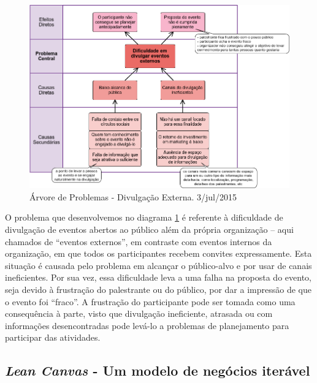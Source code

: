 \documentclass[12pt,a4paper,twoside,hyphens,english,brazil]{abntex2}
\begin{document}
\begin{figure}[!h]
	\centering
	\includegraphics[width=1\linewidth]{diagramas/arvore-problemas-divulgacao.png}
	\caption{Árvore de Problemas - Divulgação Externa. 3/jul/2015}
	\label{diag:arvore}
\end{figure}

O problema que desenvolvemos no diagrama \ref{diag:arvore} é referente à dificuldade de divulgação de eventos abertos ao público além da própria organização -- aqui chamados de ``eventos externos'', em contraste com eventos internos da organização, em que todos os participantes recebem convites expressamente. Esta situação é causada pelo problema em alcançar o público-alvo e por usar de canais ineficientes. Por sua vez, essa dificuldade leva a uma falha na proposta do evento, seja devido à frustração do palestrante ou do público, por dar a impressão de que o evento foi ``fraco''. A frustração do participante pode ser tomada como uma consequência à parte, visto que divulgação ineficiente, atrasada ou com informações desencontradas pode levá-lo a problemas de planejamento para participar das atividades.


\subsection{\emph{Lean Canvas} - Um modelo de negócios iterável} \label{sec:lean-canvas}
\end{document}

